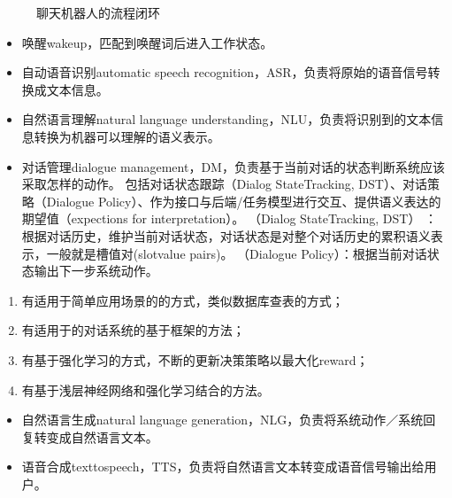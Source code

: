 \documentclass[letterpaper,10pt,english]{sphinxmanual}
\begin{document}
\begin{figure}[H]
\centering
\capstart

\noindent{}
\caption{聊天机器人的流程闭环\sphinxfootnotemark[962]}\label{\detokenize{chapter_AI_dive/chatbot:id13}}\end{figure}
%
\begin{footnotetext}[962]\sphinxAtStartFootnote
{}
%
\end{footnotetext}\ignorespaces \begin{itemize}
\item {} 
唤醒wakeup，匹配到唤醒词后进入工作状态。

\item {} 
自动语音识别automatic speech
recognition，ASR，负责将原始的语音信号转换成文本信息。

\item {} 
自然语言理解natural language
understanding，NLU，负责将识别到的文本信息转换为机器可以理解的语义表示。

\item {} 
对话管理dialogue
management，DM，负责基于当前对话的状态判断系统应该采取怎样的动作。
包括对话状态跟踪（Dialog StateTracking, DST）、对话策略（Dialogue
Policy）、作为接口与后端/任务模型进行交互、提供语义表达的期望值（expections
for interpretation）。 （Dialog StateTracking,
DST）
：根据对话历史，维护当前对话状态，对话状态是对整个对话历史的累积语义表示，一般就是槽值对(slot\sphinxhyphen{}value
pairs)。 （Dialogue
Policy）：根据当前对话状态输出下一步系统动作。%
\begin{footnote}[963]\sphinxAtStartFootnote
{}
%
\end{footnote}

\end{itemize}
\begin{enumerate}
%
\item {} 
有适用于简单应用场景的的方式，类似数据库查表的方式；

\item {} 
有适用于的对话系统的基于框架的方法；

\item {} 
有基于强化学习的方式，不断的更新决策策略以最大化reward；

\item {} 
有基于浅层神经网络和强化学习结合的方法。

\end{enumerate}
\begin{itemize}
\item {} 
自然语言生成natural language
generation，NLG，负责将系统动作／系统回复转变成自然语言文本。

\item {} 
语音合成text\sphinxhyphen{}to\sphinxhyphen{}speech，TTS，负责将自然语言文本转变成语音信号输出给用户。

\end{itemize}
\end{document}

